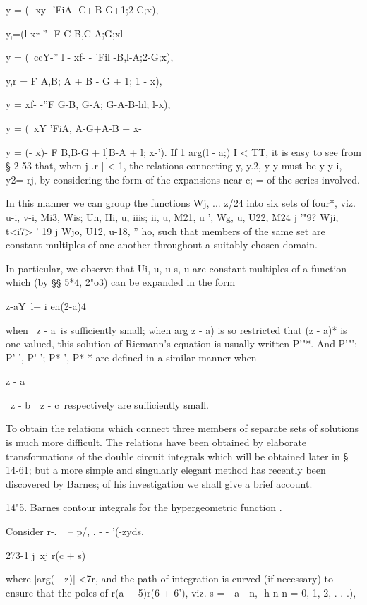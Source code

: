 y = (- xy- 'FiA -C+\,B-G+1;2-C;x),

y,=(l-xr-''- F C-B,C-A;G;xl

y = (\ ccY-'' l - xf- - 'Fil -B,l-A;2-G;x),

y,r = F A,B; A + B - G + 1; 1 - x),

y = xf- -''F G-B, G-A; G-A-B-hl; l-x),

y = (\ xY 'FiA, A-G+\;A-B + \; x-%

y = (- x)- F B,B-G + l]B-A + l; x-'). If 1 arg(l - a;) I < TT, it is
easy to see from § 2-53 that, when j .r | < 1, the relations
connecting y, y.2, y y must be y y-i, y2= rj, by considering the
form of the expansions near c; = of the series involved.

In this manner we can group the functions Wj, ... z/24 into six sets
of four*, viz. u-i, v-i, Mi3, Wis; Un, Hi, u, iiis; ii, u, M21, u
', Wg, u, U22, M24 j '"9? Wji, t<i7> ' 19 j Wjo, U12, u-18, '' ho,
such that members of the same set are constant multiples of one
another throughout a suitably chosen domain.

In particular, we observe that Ui, u, u s, u are constant multiples
of a function which (by §§ 5*4, 2"o3) can be expanded in the form

 z-aY\ l+ i en(2-a)4

when \ z - a\ is sufficiently small; when arg z - a) is so restricted
that (z - a)* is one-valued, this solution of Riemann's equation is
usually written P'"*. And P'"'; P' ', P' '; P* ', P* * are defined in
a similar manner when

z - a

\ z - b\, \ z - c\ respectively are sufficiently small.

To obtain the relations which connect three members of separate sets
of solutions is much more difficult. The relations have been obtained
by elaborate transformations of the double circuit integrals which
will be obtained later in § 14-61; but a more simple and singularly
elegant method has recently been discovered by Barnes; of his
investigation we shall give a brief account.

14"5. Barnes contour integrals for the hypergeometric function .

Consider r-. ~ -- p/, . - - '(-zyds,

273-1 j\ xj r(c + s)

where |arg(- -z)] <7r, and the path of integration is curved (if
necessary) to ensure that the poles of r(a + 5)r(6 + 6'), viz. s = - a
- n, -h-n n = 0, 1, 2, . . .),

